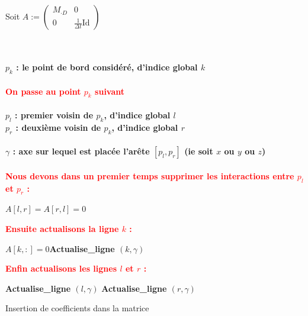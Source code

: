 \documentclass[11pt,a4paper]{article}
\begin{document}
\begin{algorithm}[H]
\SetAlgoLined
Soit $A:=\left(\begin{array}{c|c}
M_{\cdot D} & 0\\
\hline
0 & \frac{1}{\Delta t}\text{Id}
\end{array}\right)$\\
~\\
{
	~\\
	\textbf{$p_k$ : le point de bord considéré, d'indice global $k$}\\
	~\\
	{	
		\textcolor{red}{\textbf{On passe au point $p_k$ suivant}}\\
	}
	~\\
	\textbf{$p_l$ : premier voisin de $p_k$, d'indice global $l$}\\
	\textbf{$p_r$ : deuxième voisin de $p_k$, d'indice global $r$}\\
	~\\
	\textbf{$\gamma$ : axe sur lequel est placée l'arête $[p_l,p_r]$ (ie soit $x$ ou $y$ ou $z$)}\\
	~\\
	\textcolor{red}{\textbf{Nous devons dans un premier temps supprimer les interactions entre $p_l$ et $p_r$ :}}
	\begin{center}
	$A [l, r] = A [r, l] = 0$
	\end{center}
	\textcolor{red}{\textbf{Ensuite actualisons la ligne $k$ :}}
	\begin{center}
	$A [k, :] = 0$\hspace{1cm}\textbf{Actualise\_ligne $(k, \gamma)$}
	\end{center}
	\textcolor{red}{\textbf{Enfin actualisons les lignes $l$ et $r$ :}}
	\begin{center}
	\textbf{Actualise\_ligne $(l, \gamma)$}\hspace{1cm}
	\textbf{Actualise\_ligne $(r, \gamma)$}
	\end{center}
}
\caption{Insertion de coefficients dans la matrice}
\end{algorithm}
\end{document}
